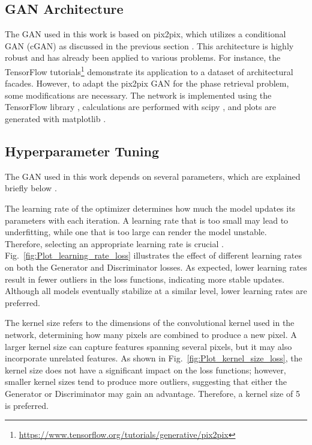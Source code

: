 \subsection{GAN Architecture}
The GAN used in this work is based on pix2pix, which utilizes a conditional GAN (cGAN) as discussed in the previous section \citep{isola2017image}. This architecture is highly robust and has already been applied to various problems. For instance, the TensorFlow tutorials\footnote{\url{https://www.tensorflow.org/tutorials/generative/pix2pix}} demonstrate its application to a dataset of architectural facades. However, to adapt the pix2pix GAN for the phase retrieval problem, some modifications are necessary. The network is implemented using the TensorFlow library \citep{abadi2016tensorflow}, calculations are performed with scipy \citep{virtanen2020scipy}, and plots are generated with matplotlib \citep{4160265}.

\subsection{Hyperparameter Tuning}
The GAN used in this work depends on several parameters, which are explained briefly below \citep[for a more in-depth discussion, see][]{murphy2022probabilistic}.

The learning rate of the optimizer determines how much the model updates its parameters with each iteration. A learning rate that is too small may lead to underfitting, while one that is too large can render the model unstable. Therefore, selecting an appropriate learning rate is crucial \citep{murphy2022probabilistic}. Fig.~\ref{fig:Plot_learning_rate_loss} illustrates the effect of different learning rates on both the Generator and Discriminator losses. As expected, lower learning rates result in fewer outliers in the loss functions, indicating more stable updates. Although all models eventually stabilize at a similar level, lower learning rates are preferred.

The kernel size refers to the dimensions of the convolutional kernel used in the network, determining how many pixels are combined to produce a new pixel. A larger kernel size can capture features spanning several pixels, but it may also incorporate unrelated features. As shown in Fig.~\ref{fig:Plot_kernel_size_loss}, the kernel size does not have a significant impact on the loss functions; however, smaller kernel sizes tend to produce more outliers, suggesting that either the Generator or Discriminator may gain an advantage. Therefore, a kernel size of 5 is preferred.

